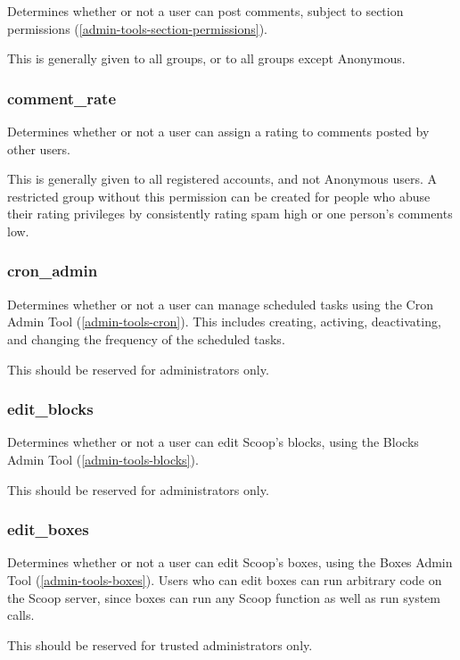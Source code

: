 Determines whether or not a user can post comments, subject to section permissions (\ref{admin-tools-section-permissions}).

This is generally given to all groups, or to all groups except Anonymous.

\subsubsection{comment\_rate}
\label{perm-comment-rate}

Determines whether or not a user can assign a rating to comments posted by other users.

This is generally given to all registered accounts, and not Anonymous users.  A restricted group without this permission can be created for people who abuse their rating privileges by consistently rating spam high or one person's comments low.

\subsubsection{cron\_admin}
\label{perm-cron-admin}

Determines whether or not a user can manage scheduled tasks using the Cron Admin Tool (\ref{admin-tools-cron}).  This includes creating, activing, deactivating, and changing the frequency of the scheduled tasks.

This should be reserved for administrators only.

\subsubsection{edit\_blocks}
\label{perm-edit-blocks}

Determines whether or not a user can edit Scoop's blocks, using the Blocks Admin Tool (\ref{admin-tools-blocks}).

This should be reserved for administrators only.

\subsubsection{edit\_boxes}
\label{perm-edit-boxes}

Determines whether or not a user can edit Scoop's boxes, using the Boxes Admin Tool (\ref{admin-tools-boxes}).  Users who can edit boxes can run arbitrary code on the Scoop server, since boxes can run any Scoop function as well as run system calls.

This should be reserved for trusted administrators only.

